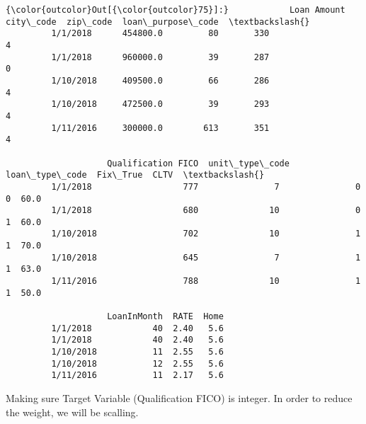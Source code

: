 \documentclass[11pt]{article}
\begin{document}
\begin{Verbatim}[commandchars=\\\{\}]
{\color{outcolor}Out[{\color{outcolor}75}]:}            Loan Amount  city\_code  zip\_code  loan\_purpose\_code  \textbackslash{}
         1/1/2018      454800.0         80       330                  4   
         1/1/2018      960000.0         39       287                  0   
         1/10/2018     409500.0         66       286                  4   
         1/10/2018     472500.0         39       293                  4   
         1/11/2016     300000.0        613       351                  4   
         
                    Qualification FICO  unit\_type\_code  loan\_type\_code  Fix\_True  CLTV  \textbackslash{}
         1/1/2018                  777               7               0         0  60.0   
         1/1/2018                  680              10               0         1  60.0   
         1/10/2018                 702              10               1         1  70.0   
         1/10/2018                 645               7               1         1  63.0   
         1/11/2016                 788              10               1         1  50.0   
         
                    LoanInMonth  RATE  Home  
         1/1/2018            40  2.40   5.6  
         1/1/2018            40  2.40   5.6  
         1/10/2018           11  2.55   5.6  
         1/10/2018           12  2.55   5.6  
         1/11/2016           11  2.17   5.6  
\end{Verbatim}
            
    Making sure Target Variable (Qualification FICO) is integer. In order to
reduce the weight, we will be scalling.
\end{document}
